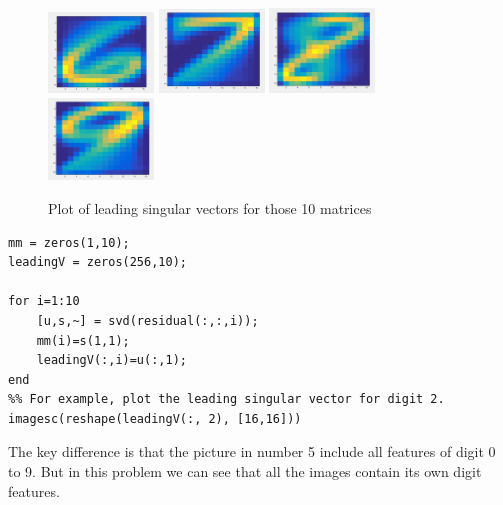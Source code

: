 \documentclass{article}
\begin{document}
\begin{enumerate}
\begin{figure}
\includegraphics[width=0.25\textwidth, height=0.25\textwidth]{newpic6}
\includegraphics[width=0.25\textwidth, height=0.25\textwidth]{newpic7}
\includegraphics[width=0.25\textwidth, height=0.25\textwidth]{newpic8}
\includegraphics[width=0.25\textwidth, height=0.25\textwidth]{newpic9}
\caption{Plot of leading singular vectors for those 10 matrices }
 \end{figure}
 
 \begin{lstlisting}
mm = zeros(1,10); 
leadingV = zeros(256,10); 

for i=1:10
    [u,s,~] = svd(residual(:,:,i)); 
    mm(i)=s(1,1); 
    leadingV(:,i)=u(:,1); 
end
%% For example, plot the leading singular vector for digit 2. 
imagesc(reshape(leadingV(:, 2), [16,16]))
 \end{lstlisting}

The key difference is that the picture in number 5 include all features of digit 0 to 9.  But in this problem we can see that all the images contain its own digit features. 
\end{enumerate} 
\end{document}
